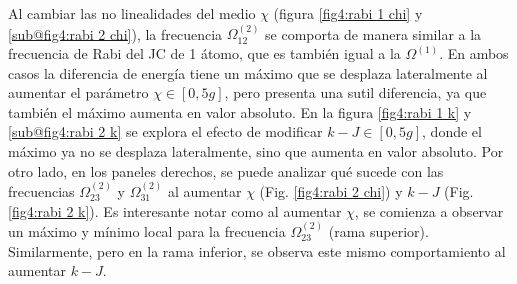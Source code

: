 
Al cambiar las no linealidades del medio $\chi$ (figura \ref{fig4:rabi 1 chi} y \ref{sub@fig4:rabi 2 chi}), la frecuencia $\Omega^{(2)}_{12}$ se comporta de manera similar a la frecuencia de Rabi del JC de 1 átomo, que es también igual a la $\Omega^{(1)}$. En ambos casos la diferencia de energía tiene un máximo que se desplaza lateralmente al aumentar el parámetro $\chi\in[0,5g]$, pero presenta una sutil diferencia, ya que también el máximo aumenta en valor absoluto. En la figura \ref{fig4:rabi 1 k} y \ref{sub@fig4:rabi 2 k} se explora el efecto de modificar $k-J\in [0,5g]$, donde el máximo ya no se desplaza lateralmente, sino que aumenta en valor absoluto. Por otro lado, en los paneles derechos, se puede analizar qué sucede con las frecuencias $\Omega^{(2)}_{23}$ y $\Omega^{(2)}_{31}$ al aumentar $\chi$ (Fig. \ref{fig4:rabi 2 chi}) y $k-J$ (Fig. \ref{fig4:rabi 2 k}). Es interesante notar como al aumentar $\chi$, se comienza a observar un máximo y mínimo local para la frecuencia $\Omega^{(2)}_{23}$ (rama superior). Similarmente, pero en la rama inferior, se observa este mismo comportamiento al aumentar $k-J$.


